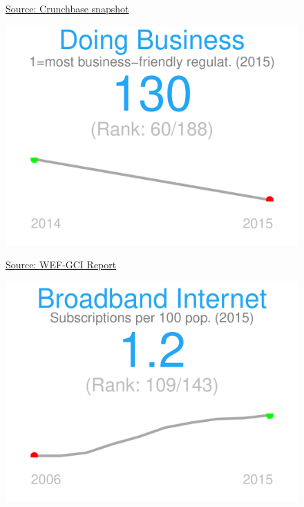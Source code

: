 \documentclass{article}\usepackage[]{graphicx}\usepackage[]{color}
\makeatletter
\def\maxwidth{ %
  \ifdim\Gin@nat@width>\linewidth
    \linewidth
  \else
    \Gin@nat@width
  \fi
}
\makeatother
\begin{document}
\begin{figure}
\begin{minipage}[t]{0.99\textwidth}
\begin{minipage}[t]{0.50\textwidth}
\begin{minipage}[c]{0.29\textwidth}
    \hspace{2ex}\tiny{\href{https://data.crunchbase.com/docs/2013-snapshot}{\textcolor[HTML]{22A6F5}{Source: Crunchbase snapshot}}}
    \vspace{3ex}
    \end{minipage}
    \begin{minipage}[c]{0.29\textwidth}


{\centering \includegraphics[width=\maxwidth]{figure/figure_sparkline2-1} 

}



    \hspace{2ex}\tiny{\href{http://www3.weforum.org/docs/gcr/2015-2016/GCI_Dataset_2006-2015.xlsx}{\textcolor[HTML]{22A6F5}{Source: WEF-GCI Report}}}
    \vspace{3ex}
    \end{minipage}
    \begin{minipage}[c]{0.29\textwidth}


{\centering \includegraphics[width=\maxwidth]{figure/figure_sparkline3-1} 

}
\end{minipage}
\end{minipage}
\end{minipage}
\end{figure}
\end{document}
